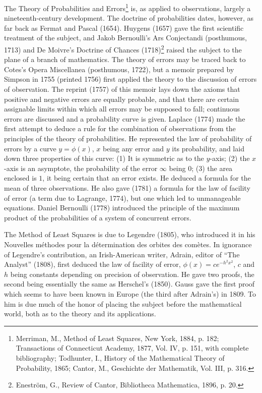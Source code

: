 \documentclass[oneside]{book}
\begin{document}
The Theory of Probabilities and Errors\footnote{Merriman, M., Method
of Least Squares, New York, 1884, p. 182; Transactions of
Connecticut Academy, 1877, Vol. IV, p. 151, with complete
bibliography; Todhunter, I., History of the Mathematical Theory of
Probability, 1865; Cantor, M., Geschichte der Mathematik, Vol. III,
p. 316.} is, as applied to observations, largely a
nineteenth-century development. The doctrine of probabilities dates,
however, as far back as Fermat and Pascal (1654). Huygens (1657)
gave the first scientific treatment of the subject, and Jakob
Bernoulli's Ars Conjectandi (posthumous, 1713) and De Moivre's
Doctrine of Chances (1718)\footnote{Enestr\"om, G., Review of
Cantor, Bibliotheca Mathematica, 1896, p. 20.} raised the subject
to the plane of a branch of mathematics. The theory of errors may
be traced back to Cotes's Opera Miscellanea (posthumous, 1722), but
a memoir prepared by Simpson in 1755 (printed 1756) first applied
the theory to the discussion of errors of observation. The reprint
(1757) of this memoir lays down the axioms that positive and
negative errors are equally probable, and that there are certain
assignable limits within which all errors may be supposed to fall;
continuous errors are discussed and a probability curve is given.
Laplace (1774) made the first attempt to deduce a rule for the
combination of observations from the principles of the theory of
probabilities. He represented the law of probability of errors by a
curve $y = \phi(x)$, $x$ being any error and $y$ its probability,
and laid down three properties of this curve: (1) It is symmetric as
to the $y$-axis; (2) the $x$-axis is an asymptote, the probability
of the error $\infty$ being $0$; (3) the area enclosed is $1$, it
being certain that an error exists. He deduced a formula for the
mean of three observations. He also gave (1781) a formula for the
law of facility of error (a term due to Lagrange, 1774), but one
which led to unmanageable equations. Daniel Bernoulli (1778)
introduced the principle of the maximum product of the probabilities
of a system of concurrent errors.

The Method of Least Squares is due to Legendre (1805), who
introduced it in his Nouvelles m\'ethodes pour la d\'etermination
des orbites des com\`etes. In ignorance of Legendre's contribution,
an Irish-American writer, Adrain, editor of ``The Analyst'' (1808),
first deduced the law of facility of error, $\phi(x) = ce^{-h^2
x^2}$, $c$ and $h$ being constants depending on precision of
observation. He gave two proofs, the second being essentially the
same as Herschel's (1850). Gauss gave the first proof which seems to
have been known in Europe (the third after Adrain's) in 1809. To him
is due much of the honor of placing the subject before the
mathematical world, both as to the theory and its applications.
\end{document}

